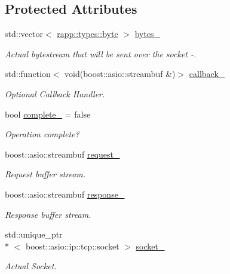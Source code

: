 \subsection*{Protected Attributes}
\begin{DoxyCompactItemize}
\item 
std\-::vector$<$ \hyperlink{namespacerapp_1_1types_a1dbc9dc2ab4507d8fb58ac3a204d307b}{rapp\-::types\-::byte} $>$ \hyperlink{classrapp_1_1services_1_1asio__service__raw_a79ed79443645b99131fb7d1b215e14bc}{bytes\-\_\-}
\begin{DoxyCompactList}\small\item\em Actual bytestream that will be sent over the socket -\/. \end{DoxyCompactList}\item 
std\-::function$<$ void(boost\-::asio\-::streambuf \&)$>$ \hyperlink{classrapp_1_1services_1_1asio__service__raw_a045f535c43a9fa18df911b7d73332358}{callback\-\_\-}
\begin{DoxyCompactList}\small\item\em Optional Callback Handler. \end{DoxyCompactList}\item 
bool \hyperlink{classrapp_1_1services_1_1asio__service__raw_a24f0666266885acbe7a2fa260f7a5383}{complete\-\_\-} = false
\begin{DoxyCompactList}\small\item\em Operation complete? \end{DoxyCompactList}\item 
boost\-::asio\-::streambuf \hyperlink{classrapp_1_1services_1_1asio__service__raw_a6d53e73589def6049fda150fab228df8}{request\-\_\-}
\begin{DoxyCompactList}\small\item\em Request buffer stream. \end{DoxyCompactList}\item 
boost\-::asio\-::streambuf \hyperlink{classrapp_1_1services_1_1asio__service__raw_a94d17ec39af125c8cfaef0db42ae1aac}{response\-\_\-}
\begin{DoxyCompactList}\small\item\em Response buffer stream. \end{DoxyCompactList}\item 
std\-::unique\-\_\-ptr\\*
$<$ boost\-::asio\-::ip\-::tcp\-::socket $>$ \hyperlink{classrapp_1_1services_1_1asio__service__raw_a070f217b7642bd28f122bd3fb29e9540}{socket\-\_\-}
\begin{DoxyCompactList}\small\item\em Actual Socket. \end{DoxyCompactList}\end{DoxyCompactItemize}


